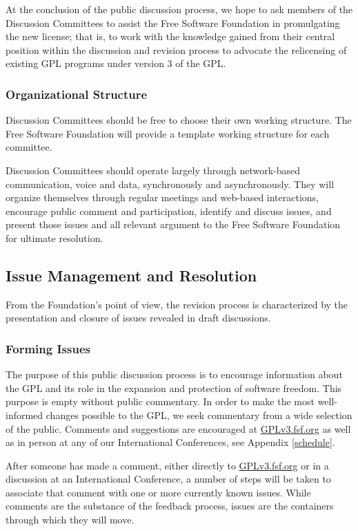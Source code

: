 \documentclass[a4paper,spanish,12pt]{book}
\begin{document}
At the conclusion of the public discussion process, we hope to ask
members of the Discussion Committees to assist the Free Software
Foundation in promulgating the new license; that is, to work with the
knowledge gained from their central position within the discussion and
revision process to advocate the relicensing of existing GPL programs
under version 3 of the GPL\@.

\subsubsection{Organizational Structure} Discussion Committees should be
free to choose their own working structure.  The Free Software
Foundation will provide a template working structure for each
committee.

Discussion Committees should operate largely through network-based
communication, voice and data, synchronously and asynchronously.  They
will organize themselves through regular meetings and web-based
interactions, encourage public comment and participation, identify and
discuss issues, and present those issues and all relevant argument to
the Free Software Foundation for ultimate resolution.


\subsection{Issue Management and Resolution} From the Foundation's point
of view, the revision process is characterized by the presentation and
closure of issues revealed in draft discussions.

\subsubsection{Forming Issues}\label{Feedback} The purpose of this public
discussion process is to encourage information about the GPL and its
role in the expansion and protection of software freedom.  This
purpose is empty without public commentary.  In order to make the most
well-informed changes possible to the GPL, we seek commentary from a
wide selection of the public.  Comments and suggestions are encouraged
at \url{GPLv3.fsf.org} as well as in person at any of our
International Conferences, see Appendix \ref{schedule}.

After someone has made a comment, either directly to
\url{GPLv3.fsf.org} or in a discussion at an International
Conference, a number of steps will be taken to associate that comment
with one or more currently known issues.  While comments are the
substance of the feedback process, issues are the containers through
which they will move.
\end{document}
